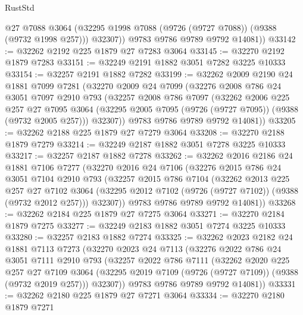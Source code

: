 \begin{lexlean}{RustStd}
\begin{coremodule}
            @27
            @7088
            @3064
            (@32295 @1998 @7088 (@9726 (@9727 @7088)) (@9388 (@9732 @1998 @257)))
            @32307))
        @9783
        @9786
        @9789
        @9792
        @14081))
@33142 := @32262 @2192 @225 @1879 @27 @7283 @3064
@33145 := @32270 @2192 @1879 @7283
@33151 := @32249 @2191 @1882 @3051 @7282 @3225 @10333
@33154 := @32257 @2191 @1882 @7282
@33199 := @32262
    @2009
    @2190
    @24
    @1881
    @7099
    @7281
    (@32270
      @2009
      @24
      @7099
      (@32276
        @2008
        @786
        @24
        @3051
        @7097
        @2910
        @793
        (@32257
          @2008
          @786
          @7097
          (@32262
            @2006
            @225
            @257
            @27
            @7095
            @3064
            (@32295 @2005 @7095 (@9726 (@9727 @7095)) (@9388 (@9732 @2005 @257)))
            @32307))
        @9783
        @9786
        @9789
        @9792
        @14081))
@33205 := @32262 @2188 @225 @1879 @27 @7279 @3064
@33208 := @32270 @2188 @1879 @7279
@33214 := @32249 @2187 @1882 @3051 @7278 @3225 @10333
@33217 := @32257 @2187 @1882 @7278
@33262 := @32262
    @2016
    @2186
    @24
    @1881
    @7106
    @7277
    (@32270
      @2016
      @24
      @7106
      (@32276
        @2015
        @786
        @24
        @3051
        @7104
        @2910
        @793
        (@32257
          @2015
          @786
          @7104
          (@32262
            @2013
            @225
            @257
            @27
            @7102
            @3064
            (@32295 @2012 @7102 (@9726 (@9727 @7102)) (@9388 (@9732 @2012 @257)))
            @32307))
        @9783
        @9786
        @9789
        @9792
        @14081))
@33268 := @32262 @2184 @225 @1879 @27 @7275 @3064
@33271 := @32270 @2184 @1879 @7275
@33277 := @32249 @2183 @1882 @3051 @7274 @3225 @10333
@33280 := @32257 @2183 @1882 @7274
@33325 := @32262
    @2023
    @2182
    @24
    @1881
    @7113
    @7273
    (@32270
      @2023
      @24
      @7113
      (@32276
        @2022
        @786
        @24
        @3051
        @7111
        @2910
        @793
        (@32257
          @2022
          @786
          @7111
          (@32262
            @2020
            @225
            @257
            @27
            @7109
            @3064
            (@32295 @2019 @7109 (@9726 (@9727 @7109)) (@9388 (@9732 @2019 @257)))
            @32307))
        @9783
        @9786
        @9789
        @9792
        @14081))
@33331 := @32262 @2180 @225 @1879 @27 @7271 @3064
@33334 := @32270 @2180 @1879 @7271

\end{coremodule}
\end{lexlean}
